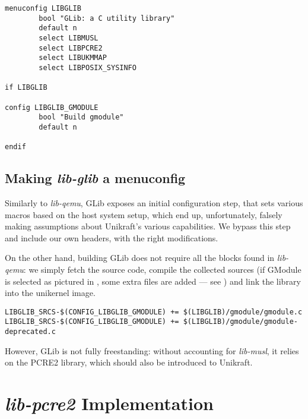 \begin{lstlisting}
menuconfig LIBGLIB
        bool "GLib: a C utility library"
        default n
        select LIBMUSL
        select LIBPCRE2
        select LIBUKMMAP
        select LIBPOSIX_SYSINFO

if LIBGLIB

config LIBGLIB_GMODULE
        bool "Build gmodule"
        default n

endif
\end{lstlisting}

\subsection{Making \textit{lib-glib} a menuconfig}
\label{subsec:glib-menuconfig}

Similarly to \textit{lib-qemu}, GLib exposes an initial configuration step, that sets various macros based on the host system setup, which end up, unfortunately, falsely making assumptions about Unikraft's various capabilities.
We bypass this step and include our own headers, with the right modifications.

On the other hand, building GLib does not require all the blocks found in \textit{lib-qemu}: we simply fetch the source code, compile the collected sources (if GModule is selected as pictured in , some extra files are added — see ) and link the library into the unikernel image.


\begin{lstlisting}
LIBGLIB_SRCS-$(CONFIG_LIBGLIB_GMODULE) += $(LIBGLIB)/gmodule/gmodule.c
LIBGLIB_SRCS-$(CONFIG_LIBGLIB_GMODULE) += $(LIBGLIB)/gmodule/gmodule-deprecated.c
\end{lstlisting}

However, GLib is not fully freestanding: without accounting for \textit{lib-musl}, it relies on the PCRE2 library, which should also be introduced to Unikraft.

\section{\textit{lib-pcre2} Implementation}
\label{sec:lib-pcre2-impl}


